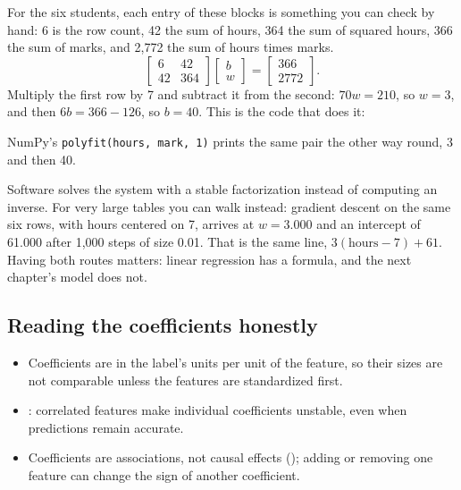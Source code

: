 \begin{workedexample}
For the six students, each entry of these blocks is something you can check by hand: 6 is the row count, 42 the sum of hours, 364 the sum of squared hours, 366 the sum of marks, and 2,772 the sum of hours times marks.
\[
\begin{bmatrix}6&42\\42&364\end{bmatrix}
\begin{bmatrix}b\\w\end{bmatrix}
=
\begin{bmatrix}366\\2772\end{bmatrix}.
\]
Multiply the first row by 7 and subtract it from the second: $70w=210$, so $w=3$, and then $6b=366-126$, so $b=40$. This is the code that does it:



NumPy's \texttt{polyfit(hours, mark, 1)} prints the same pair the other way round, 3 and then 40.
\end{workedexample}

Software solves the system with a stable factorization instead of computing an inverse. For very large tables you can walk instead: gradient descent on the same six rows, with hours centered on 7, arrives at $w=3.000$ and an intercept of 61.000 after 1,000 steps of size 0.01. That is the same line, $3(\text{hours}-7)+61$. Having both routes matters: linear regression has a formula, and the next chapter's model does not.

\subsection{Reading the coefficients honestly}

\begin{itemize}
  \item Coefficients are in the label's units per unit of the feature, so their sizes are not comparable unless the features are standardized first.
  \item {}: correlated features make individual coefficients unstable, even when predictions remain accurate.
  \item Coefficients are associations, not causal effects (); adding or removing one feature can change the sign of another coefficient.
\end{itemize}

